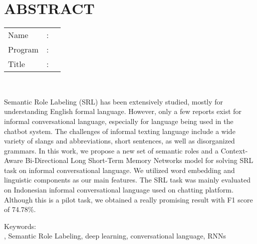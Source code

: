 %
%
%

\chapter*{ABSTRACT}

\vspace*{0.2cm}

\noindent \begin{tabular}{l l p{11.0cm}}
	Name&: & \penulis \\
	Program&: & \programEng \\
	Title&: & \judulInggris \\
\end{tabular} \\ 

\vspace*{0.5cm}

\noindent 

Semantic Role Labeling (SRL) has been extensively studied, mostly for understanding English formal language. However, only a few reports exist for informal conversational language, especially for language being used in the chatbot system. The challenges of informal texting language include a wide variety of slangs and abbreviations, short sentences, as well as disorganized grammars. In this work, we propose a new set of semantic roles and a Context-Aware Bi-Directional Long Short-Term Memory Networks model for solving SRL task on informal conversational language. We utilized word embedding and linguistic components as our main features. The SRL task was mainly evaluated on Indonesian informal conversational language used on chatting platform. Although this is a pilot task, we obtained a really promising result with F1 score of 74.78\%.


\vspace*{0.2cm}

\noindent Keywords: \\ 
\noindent \mer, Semantic Role Labeling, deep learning, conversational language, RNNs \\ 

\newpage
